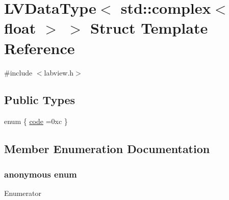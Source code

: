 \hypertarget{struct_l_v_data_type_3_01std_1_1complex_3_01float_01_4_01_4}{}\section{L\+V\+Data\+Type$<$ std\+:\+:complex$<$ float $>$ $>$ Struct Template Reference}
\label{struct_l_v_data_type_3_01std_1_1complex_3_01float_01_4_01_4}


{\ttfamily \#include $<$labview.\+h$>$}

\subsection*{Public Types}
\begin{DoxyCompactItemize}
\item 
enum \{ \hyperlink{struct_l_v_data_type_3_01std_1_1complex_3_01float_01_4_01_4_a983dcb40a3811e9332e53a232710a186ad41fe13f2836af351e6b0113f1d90f35}{code} =0xc
 \}
\end{DoxyCompactItemize}


\subsection{Member Enumeration Documentation}
\subsubsection[{\texorpdfstring{anonymous enum}{anonymous enum}}]{\setlength{\rightskip}{0pt plus 5cm}anonymous enum}\hypertarget{struct_l_v_data_type_3_01std_1_1complex_3_01float_01_4_01_4_a983dcb40a3811e9332e53a232710a186}{}\label{struct_l_v_data_type_3_01std_1_1complex_3_01float_01_4_01_4_a983dcb40a3811e9332e53a232710a186}
\begin{Desc}
\item[Enumerator]\par
\begin{description}
\item[{\em 
code\hypertarget{struct_l_v_data_type_3_01std_1_1complex_3_01float_01_4_01_4_a983dcb40a3811e9332e53a232710a186ad41fe13f2836af351e6b0113f1d90f35}{}\label{struct_l_v_data_type_3_01std_1_1complex_3_01float_01_4_01_4_a983dcb40a3811e9332e53a232710a186ad41fe13f2836af351e6b0113f1d90f35}
}]\end{description}
\end{Desc}

